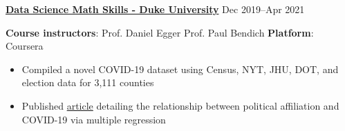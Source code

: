 \textbf{\href{https://www.coursera.org/account/accomplishments/verify/AFQSU5CAT4HD}{Data Science Math Skills - Duke University}} \hfill Dec 2019--Apr 2021 \par
\textbf{Course instructors}: Prof. Daniel Egger {\scalerel*{\cdot}{\bigodot}} Prof. Paul Bendich {\scalerel*{\cdot}{\bigodot}} \textbf{Platform}: Coursera
\begin{itemize}
	\item Compiled a novel COVID-19 dataset using Census, NYT, JHU, DOT, and election data for 3,111 counties
	\item Published \href{https://econreview.berkeley.edu/partisanship-and-covid-19-response/}{article} detailing the relationship between political affiliation and COVID-19 via multiple regression
\end{itemize}\vspace{0.1cm} \par